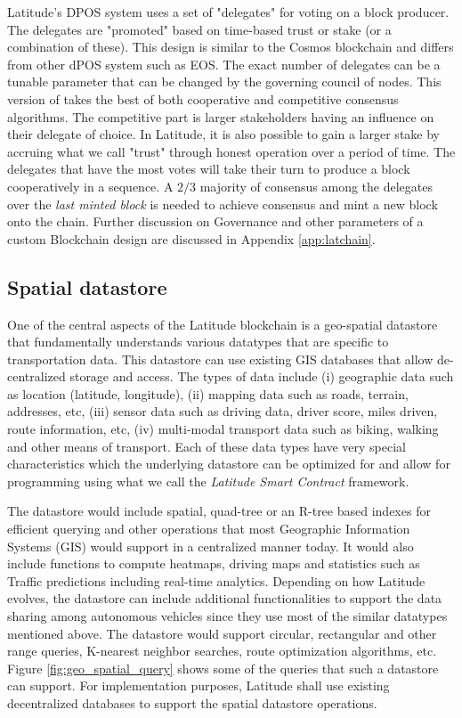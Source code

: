 Latitude's DPOS system uses a set of "delegates" for voting on a block producer. The delegates are
"promoted" based on time-based trust or stake (or a combination of these). This design is similar to the Cosmos
blockchain and differs from other dPOS system such as EOS. The exact number of delegates can be a tunable parameter that
can be changed by the governing council of nodes. This version of takes the best of both cooperative and competitive
consensus algorithms.  The competitive part is larger stakeholders having an influence on their delegate of choice. In
Latitude, it is also possible to gain a larger stake by accruing what we call "trust" through honest operation over a
period of time. The delegates that have the most votes will take their turn to produce a block cooperatively in a
sequence. A $2/3$ majority of consensus among the delegates over the {\em last minted block} is needed to achieve
consensus and mint a new block onto the chain. Further discussion on Governance and other parameters of a custom
Blockchain design are discussed in Appendix \ref{app:latchain}.

\subsection{Spatial datastore}
One of the central aspects of the Latitude blockchain is a geo-spatial datastore that fundamentally understands various
datatypes that are specific to transportation data. This datastore can use existing GIS databases that allow
de-centralized storage and access. The types of data include (i) geographic data such as location (latitude, longitude),
(ii) mapping data such as roads, terrain, addresses, etc, (iii) sensor data such as driving data, driver score, miles
driven, route information, etc, (iv) multi-modal transport data such as biking, walking and other means of transport.
Each of these data types have very special characteristics which the underlying datastore can be optimized for and allow
for programming using what we call the {\em Latitude Smart Contract} framework. 

The datastore would include spatial, quad-tree or an R-tree based indexes for efficient querying and other operations
that most Geographic Information Systems (GIS) would support in a centralized manner today. It would also include
functions to compute heatmaps, driving maps and statistics such as Traffic predictions including real-time analytics.
Depending on how Latitude evolves, the datastore can include additional functionalities to support the data sharing
among autonomous vehicles since they use most of the similar datatypes mentioned above. The datastore would support
circular, rectangular and other range queries, K-nearest neighbor searches, route optimization algorithms, etc. Figure
\ref{fig:geo_spatial_query} shows some of the queries that such a datastore can support.
For implementation purposes, Latitude shall use existing decentralized databases to support the spatial datastore
operations.

